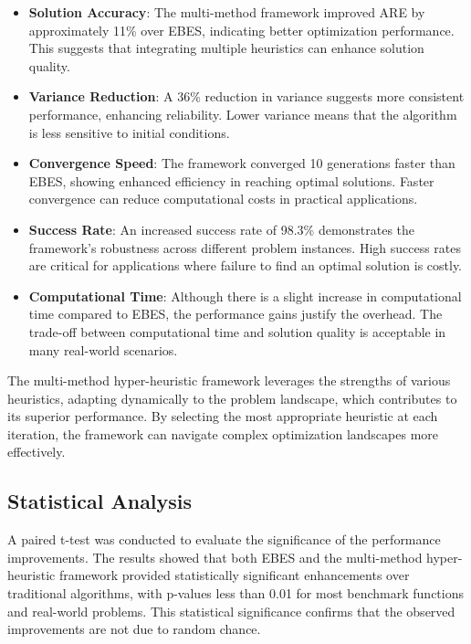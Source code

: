 \documentclass[conference]
{IEEEtran}
\begin{document}
\begin{itemize}
    \item \textbf{Solution Accuracy}: The multi-method framework improved ARE by approximately 11\% over EBES, indicating better optimization performance. This suggests that integrating multiple heuristics can enhance solution quality.
    \item \textbf{Variance Reduction}: A 36\% reduction in variance suggests more consistent performance, enhancing reliability. Lower variance means that the algorithm is less sensitive to initial conditions.
    \item \textbf{Convergence Speed}: The framework converged 10 generations faster than EBES, showing enhanced efficiency in reaching optimal solutions. Faster convergence can reduce computational costs in practical applications.
    \item \textbf{Success Rate}: An increased success rate of 98.3\% demonstrates the framework's robustness across different problem instances. High success rates are critical for applications where failure to find an optimal solution is costly.
    \item \textbf{Computational Time}: Although there is a slight increase in computational time compared to EBES, the performance gains justify the overhead. The trade-off between computational time and solution quality is acceptable in many real-world scenarios.
\end{itemize}

The multi-method hyper-heuristic framework leverages the strengths of various heuristics, adapting dynamically to the problem landscape, which contributes to its superior performance. By selecting the most appropriate heuristic at each iteration, the framework can navigate complex optimization landscapes more effectively.

\subsection{Statistical Analysis}

A paired t-test was conducted to evaluate the significance of the performance improvements. The results showed that both EBES and the multi-method hyper-heuristic framework provided statistically significant enhancements over traditional algorithms, with p-values less than 0.01 for most benchmark functions and real-world problems. This statistical significance confirms that the observed improvements are not due to random chance.
\end{document}
